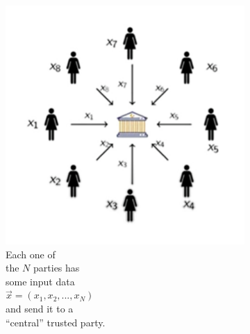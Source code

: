 \documentclass[12pt]{article}
\begin{document}
    \begin{figure}[ht]
        \captionsetup{justification=centering}
        \centering
        \begin{subfigure}{.33\textwidth}
            \centering
            \includegraphics[width=\linewidth]{figures/images/img-1.pdf}
            \caption{Each one of\\ the $N$ parties has\\ some input data\\ $\vec{x} = ({x}_{1}, {x}_{2}, ..., {x}_{N})$\\ and send it to a\\ ``central'' trusted party.}
            \label{fig:secure-multi-party-computation-protocol-step-1}
        \end{subfigure}%
        \begin{subfigure}{.33\textwidth}
            \centering

\end{subfigure}
\end{figure}
\end{document}
